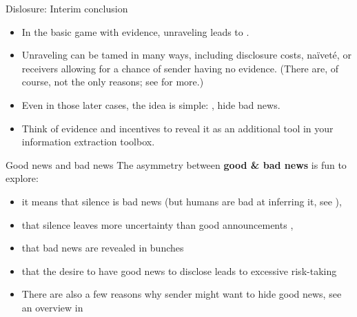 \documentclass[english,10pt
,aspectratio=169
]{beamer}
\begin{document}
\begin{frame}{Dislosure: Interim conclusion}
\begin{itemize}
	\item In the basic game with evidence, unraveling leads to .
	\item Unraveling can be tamed in many ways, including disclosure costs, na{\"i}vet{\'e}, or receivers allowing for a chance of sender having no evidence. (There are, of course, not the only reasons; see \cite{dranove_quality_2010} for more.)
	\item Even in those later cases, the idea is simple: , \alert{hide bad news}.
	\item Think of evidence and incentives to reveal it as an additional tool in your information extraction toolbox.
\end{itemize}
\end{frame}


\begin{frame}{Good news and bad news}
	The asymmetry between \textbf{good \& bad news} is fun to explore:
	\begin{itemize}[<+->]
		\item it means that \alert{silence is bad news} (but humans are bad at inferring it, see \cite*{jin_is_2021}), 
		\item that \alert{silence leaves more uncertainty} than good announcements \citep{shin_disclosures_2003}, 
		\item that bad news are revealed in \alert{bunches} \citep*{acharya_endogenous_2011}
		\item that the desire to have good news to disclose leads to \alert{excessive risk-taking} \citep*{ben-porath_disclosure_2018} %
		
		\bigskip 
		\item There are also a few reasons why sender might want to hide good news, see an overview in \cite{smirnov_bad_2022}
	\end{itemize}
\end{frame}


\end{document}
